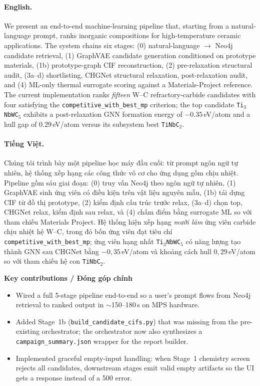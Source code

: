 \documentclass[11pt,a4paper]{report}
\newcommand{\eV}{eV/atom}
\begin{document}
\paragraph{English.}
We present an end-to-end machine-learning pipeline that, starting from a natural-language
prompt, ranks inorganic compositions for high-temperature ceramic applications. The system
chains six stages: (0) natural-language $\to$ Neo4j candidate retrieval, (1) GraphVAE
candidate generation conditioned on prototype materials, (1b) prototype-graph CIF
reconstruction, (2) pre-relaxation structural audit, (3a--d) shortlisting, CHGNet structural
relaxation, post-relaxation audit, and (4) ML-only thermal surrogate scoring against a
Materials-Project reference. The current implementation ranks
\textit{fifteen} W--C refractory-carbide candidates with four satisfying the
\texttt{competitive\_with\_best\_mp} criterion; the top candidate \texttt{Ti$_3$NbWC$_5$}
exhibits a post-relaxation GNN formation energy of $-0.35$\,\eV{} and a hull gap of
$0.29$\,\eV{} versus its subsystem best \texttt{TiNbC$_2$}.

\paragraph{Tiếng Việt.}
Chúng tôi trình bày một pipeline học máy đầu cuối: từ prompt ngôn ngữ tự nhiên, hệ thống
xếp hạng các công thức vô cơ cho ứng dụng gốm chịu nhiệt. Pipeline gồm sáu giai đoạn:
(0) truy vấn Neo4j theo ngôn ngữ tự nhiên, (1) GraphVAE sinh ứng viên có điều kiện trên vật
liệu nguyên mẫu, (1b) tái dựng CIF từ đồ thị prototype, (2) kiểm định cấu trúc trước relax,
(3a--d) chọn top, CHGNet relax, kiểm định sau relax, và (4) chấm điểm bằng surrogate ML so
với tham chiếu Materials Project. Hệ thống hiện xếp hạng \textit{mười lăm} ứng viên carbide
chịu nhiệt hệ W--C, trong đó bốn ứng viên đạt tiêu chí \texttt{competitive\_with\_best\_mp};
ứng viên hạng nhất \texttt{Ti$_3$NbWC$_5$} có năng lượng tạo thành GNN sau CHGNet bằng
$-0{,}35$\,\eV{} và khoảng cách hull $0{,}29$\,\eV{} so với tham chiếu hệ con
\texttt{TiNbC$_2$}.

\vspace{0.5em}
\noindent\textbf{Key contributions / Đóng góp chính}
\begin{itemize}[leftmargin=*,itemsep=2pt]
\item Wired a full 5-stage pipeline end-to-end so a user's prompt flows from Neo4j
      retrieval to ranked output in $\sim$150--180\,s on MPS hardware.
\item Added Stage~1b (\texttt{build\_candidate\_cifs.py}) that was missing from the
      pre-existing orchestrator; the orchestrator now also synthesizes a
      \texttt{campaign\_summary.json} wrapper for the report builder.
\item Implemented graceful empty-input handling: when Stage~1 chemistry screen rejects
      all candidates, downstream stages emit valid empty artifacts so the UI gets a
      response instead of a 500 error.
\end{itemize}
\end{document}
